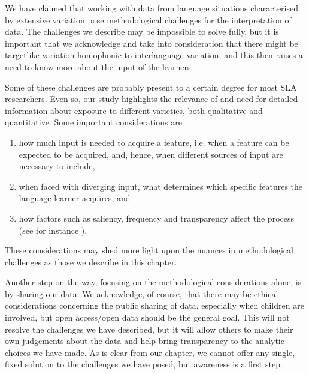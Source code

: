\documentclass[output=paper,colorlinks,citecolor=brown,modfonts,nonflat]{../langscibook}
\begin{document}
We have claimed that working with data from language situations characterised by extensive variation pose methodological challenges for the interpretation of data. The challenges we describe may be impossible to solve fully, but it is important that we acknowledge and take into consideration that there might be targetlike variation homophonic to interlanguage variation, and this then raises a need to know more about the input of the learners.

Some of these challenges are probably present to a certain degree for most SLA researchers. Even so, our study highlights the relevance of and need for detailed information about exposure to different varieties, both qualitative and quantitative. Some important considerations are 

\begin{enumerate}[label=\alph*.]
\item how much input is needed to acquire a feature, i.e. when a feature can be expected to be acquired, and, hence, when different sources of input are necessary to include, 
\item when faced with diverging input, what determines which specific features the language learner acquires, and 
\item how factors such as saliency, frequency and transparency affect the process (see for instance \citealt{Sun2008}). 
\end{enumerate}
These considerations may shed more light upon the nuances in methodological challenges as those we describe in this chapter.

Another step on the way, focusing on the methodological considerations alone, is by sharing our data. We acknowledge, of course, that there may be ethical considerations concerning the public sharing of data, especially when children are involved, but open access/open data should be the general goal. This will not resolve the challenges we have described, but it will allow others to make their own judgements about the data and help bring transparency to the analytic choices we have made. As is clear from our chapter, we cannot offer any single, fixed solution to the challenges we have posed, but awareness is a first step. 

{\sloppy\printbibliography[heading=subbibliography,notkeyword=this]}
\end{document}
